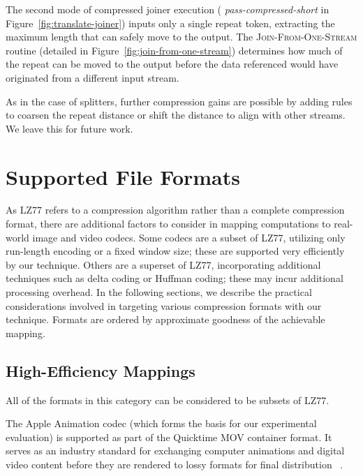 The second mode of compressed joiner execution ({\it
  pass-compressed-short} in Figure~\ref{fig:translate-joiner}) inputs
  only a single repeat token, extracting the maximum length that can
  safely move to the output.  The
\textsc{Join-From-One-Stream} routine (detailed in
Figure~\ref{fig:join-from-one-stream}) determines how much of the repeat can
be moved to the output before the data referenced would have
originated from a different input stream.

As in the case of splitters, further compression gains are possible by
adding rules to coarsen the repeat distance or shift the distance to
align with other streams.  We leave this for future work.

\section{Supported File Formats}
\label{sec:formats}

As LZ77 refers to a compression algorithm rather than a complete
compression format, there are additional factors to consider in
mapping computations to real-world image and video codecs.  Some
codecs are a subset of LZ77, utilizing only run-length encoding or a
fixed window size; these are supported very efficiently by our
technique.  Others are a superset of LZ77, incorporating additional
techniques such as delta coding or Huffman coding; these may incur
additional processing overhead.  In the following sections, we
describe the practical considerations involved in targeting various
compression formats with our technique.  Formats are ordered by
approximate goodness of the achievable mapping.

\subsection*{High-Efficiency Mappings}
\label{sec:formats-good}

All of the formats in this category can be considered to be subsets of
LZ77.

\mybegin

  The Apple Animation codec (which forms
  the basis for our experimental evaluation) is supported as part of
  the Quicktime MOV container format.  It serves as an industry
  standard for exchanging computer animations and digital video
  content before they are rendered to lossy formats for final
  distribution~\cite[p.~106]{adobe-anim}\cite[p.~284]{harrington-anim}
  \cite[p.~367]{long-anim}\cite[p.~280]{pogue-anim}.

